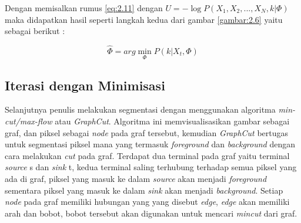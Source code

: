 Dengan memisalkan rumus \ref{eq:2.11} dengan \(U = - \log P(X_1, X_2, ..., X_N, k | \Phi)\)
maka didapatkan hasil seperti langkah kedua dari gambar \ref{gambar:2.6} yaitu 
sebagai berikut :

\begin{equation} \label{}
	\hat{\Phi} = arg \min_{\Phi} P(k|X_t,\Phi)
\end{equation}







\subsection{Iterasi dengan Minimisasi}

Selanjutnya penulis melakukan segmentasi dengan menggunakan algoritma \emph{min-cut/max-flow}
atau \emph{GraphCut}. Algoritma ini memvisualisasikan gambar sebagai graf, dan piksel 
sebagai \emph{node} pada graf tersebut, kemudian \emph{GraphCut} bertugas untuk 
segmentasi piksel mana yang termasuk \emph{foreground} dan \emph{background} dengan cara
melakukan \emph{cut} pada graf. Terdapat dua terminal pada graf yaitu terminal \emph{source} s
dan \emph{sink} t, kedua terminal saling terhubung terhadap semua piksel yang ada di graf,
piksel yang masuk ke dalam \emph{source} akan menjadi \emph{foreground} sementara piksel
yang masuk ke dalam \emph{sink} akan menjadi \emph{background}. Setiap \emph{node} 
pada graf memiliki hubungan yang yang disebut \emph{edge}, \emph{edge} akan memiliki arah 
dan bobot, bobot tersebut akan digunakan untuk mencari \emph{mincut} dari graf.


